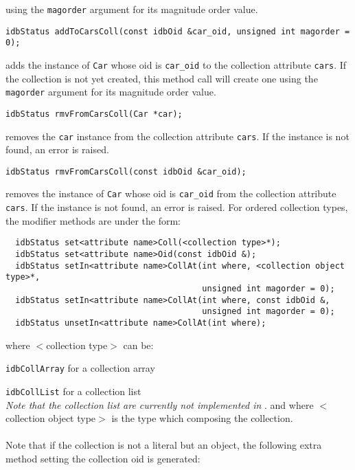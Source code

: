 using the \texttt{magorder} argument for its magnitude order value.
\item
\verbsize
\begin{verbatim}
idbStatus addToCarsColl(const idbOid &car_oid, unsigned int magorder = 0);
\end{verbatim}
\normalsize
adds the instance of \texttt{Car} whose oid is \texttt{car\_oid}
to the collection attribute \texttt{cars}.
If the collection is not yet created, this method call will create one
using the \texttt{magorder} argument for its magnitude order value.
\item
\verbsize
\begin{verbatim}
idbStatus rmvFromCarsColl(Car *car);
\end{verbatim}
\normalsize
removes the \texttt{car} instance from the collection attribute \texttt{cars}.
If the instance is not found, an error is raised.
\item
\verbsize
\begin{verbatim}
idbStatus rmvFromCarsColl(const idbOid &car_oid);
\end{verbatim}
\normalsize
removes the instance of \texttt{Car} whose oid is \texttt{car\_oid}
from the collection attribute \texttt{cars}.
If the instance is not found, an error is raised.
\ee
For ordered collection types, the modifier methods are under the form:
\verbsize
\begin{verbatim}
  idbStatus set<attribute name>Coll(<collection type>*);
  idbStatus set<attribute name>Oid(const idbOid &);
  idbStatus setIn<attribute name>CollAt(int where, <collection object type>*,
                                        unsigned int magorder = 0);
  idbStatus setIn<attribute name>CollAt(int where, const idbOid &,
                                        unsigned int magorder = 0);
  idbStatus unsetIn<attribute name>CollAt(int where);
\end{verbatim}
\normalsize
where $<$collection type$>$ can be:
\be
\item \texttt{idbCollArray} for a collection array
\item \texttt{idbCollList} for a collection list\\
\emph{Note that the collection list are currently not implemented in
\eyedb}.
\ee
and where $<$collection object type$>$ is the type which composing
the collection.
\\
\\
Note that if the collection is not a literal but an object, the following
extra method setting the collection oid is generated:
